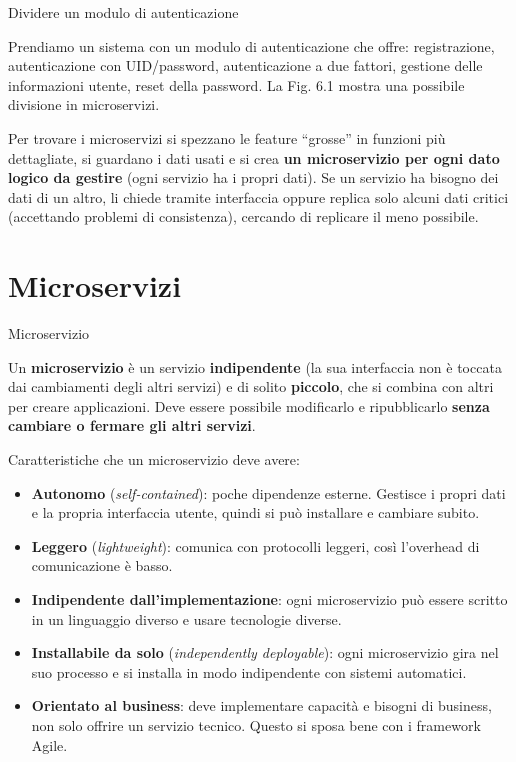 \begin{boxexample}{Dividere un modulo di autenticazione}

Prendiamo un sistema con un modulo di autenticazione che offre:
registrazione, autenticazione con UID/password, autenticazione a due
fattori, gestione delle informazioni utente, reset della password. La
Fig. 6.1 mostra una possibile divisione in microservizi.

Per trovare i microservizi si spezzano le feature ``grosse'' in funzioni
più dettagliate, si guardano i dati usati e si crea \textbf{un
microservizio per ogni dato logico da gestire} (ogni servizio ha i
propri dati). Se un servizio ha bisogno dei dati di un altro, li chiede
tramite interfaccia oppure replica solo alcuni dati critici (accettando
problemi di consistenza), cercando di replicare il meno possibile.

\end{boxexample}

\section{Microservizi}\label{microservizi}

\begin{boxdefinition}{Microservizio}

Un \textbf{microservizio} è un servizio \textbf{indipendente} (la sua
interfaccia non è toccata dai cambiamenti degli altri servizi) e di
solito \textbf{piccolo}, che si combina con altri per creare
applicazioni. Deve essere possibile modificarlo e ripubblicarlo
\textbf{senza cambiare o fermare gli altri servizi}.

\end{boxdefinition}

Caratteristiche che un microservizio deve avere:

\begin{itemize}
\tightlist
\item
  \textbf{Autonomo} (\emph{self-contained}): poche dipendenze esterne.
  Gestisce i propri dati e la propria interfaccia utente, quindi si può
  installare e cambiare subito.
\item
  \textbf{Leggero} (\emph{lightweight}): comunica con protocolli
  leggeri, così l'overhead di comunicazione è basso.
\item
  \textbf{Indipendente dall'implementazione}: ogni microservizio può
  essere scritto in un linguaggio diverso e usare tecnologie diverse.
\item
  \textbf{Installabile da solo} (\emph{independently deployable}): ogni
  microservizio gira nel suo processo e si installa in modo indipendente
  con sistemi automatici.
\item
  \textbf{Orientato al business}: deve implementare capacità e bisogni
  di business, non solo offrire un servizio tecnico. Questo si sposa
  bene con i framework Agile.
\end{itemize}

